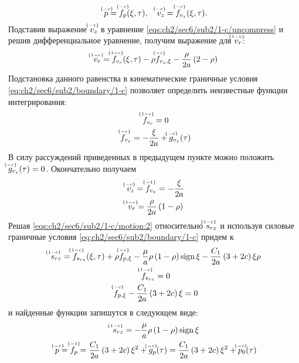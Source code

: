 \begin{equation*}
  \uindex{p}{-c} = \uindex{f}{-c}_{p}(\xi, \tau), \quad \uindex{v}{-c}_{z} = \uindex{f}{-c}_{v_{z}}(\xi, \tau).
\end{equation*}
Подставив выражение $\uindex{v}{-1}_{z}$ в уравнение \cref{eqs:ch2/sec6/sub2/1-c/uncompress} и решив дифференциальное уравнение, получим выражение для $\uindex{v}{1-c}_{r}$:
\begin{equation*}
  \uindex{v}{1-c}_{r} = \uindex{f}{1-c}_{v_{r}}(\xi, \tau) -\rho \uindex{f}{-c}_{v_{z},\xi} - \frac{\rho}{2a}\left(2-\rho\right)
\end{equation*}
Подстановка данного равенства в кинематические граничные условия \cref{eq:ch2/sec6/sub2/boundary/1-c} позволяет определить неизвестные функции интегрирования:
\begin{gather*}
  \uindex{f}{1-c}_{v_{r}} = 0
  \\
  \uindex{f}{-c}_{v_{z}} = -\frac{\xi}{2a} + \uindex{g}{-c}_{v_{z}}(\tau)
\end{gather*}
В силу рассуждений приведенных в предыдущем пункте можно положить $\uindex{g}{-c}_{v_{z}}(\tau) = 0$. Окончательно получаем
\begin{gather}
  \label{sol:ch2/sec6/sub2/vz/-c}
  \uindex{v}{-c}_{z} = \uindex{f}{-1}_{v_{z}} = -\frac{\xi}{2a}
  \\
  \label{sol:ch2/sec6/sub2/vr/1-c}
  \uindex{v}{1-c}_{r} =  \frac{\rho}{2a}\left(1-\rho\right)
\end{gather}
Решая \cref{eqs:ch2/sec6/sub2/1-c/motion:2} относительно $\uindex{s}{1-c}_{rz}$ и используя силовые граничные условия \cref{eq:ch2/sec6/sub2/boundary/1-c} придем к
\begin{gather*}
  \uindex{s}{1-c}_{rz} = \uindex{f}{1-c}_{s_{rz}}(\xi, \tau) + \rho \uindex{f}{-c}_{p,\xi} - \frac{\mu}{a} \rho\left(1-\rho\right)\sign\xi - \frac{C_1}{2a}\left(3+2c\right)\xi\rho
  \\
  \uindex{f}{1-c}_{s_{rz}} = 0
  \\
  \uindex{f}{-c}_{p,\xi} - \frac{C_1}{2a}\left(3+2c\right)\xi = 0
\end{gather*}
и найденные функции запишутся в следующем виде:
\begin{gather}
  \label{sol:ch2/sec6/sub2/srz/1-c}
  \uindex{s}{1-c}_{rz} = - \frac{\mu}{a} \rho\left(1-\rho\right)\sign\xi
  \\
  \label{sol:ch2/sec6/sub2/p/-c}
  \uindex{p}{-c}=\uindex{f}{-1}_{p} = \frac{C_1}{2a}\left(3+2c\right)\xi^2 + \uindex{g}{-c}_{p}(\tau) = \frac{C_1}{2a}\left(3+2c\right)\xi^2 + \uindex{p}{-c}_{0}(\tau)
\end{gather}
